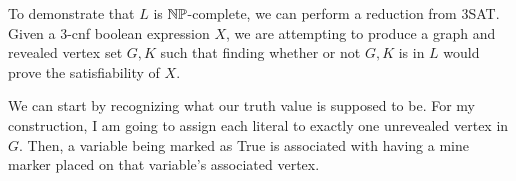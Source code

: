 \documentclass[11pt, reqno]{amsart}
\theoremstyle{plain}
\theoremstyle{definition}
\newcounter{r}
\begin{document}
\begin{enumerate}

    To demonstrate that $L$ is $\mathbb{N}\mathbb{P}$-complete, we can perform a reduction
    from 3SAT. Given a 3-cnf boolean expression $X$, we are attempting
    to produce a graph and revealed vertex set $G, K$ such that finding whether
    or not $G, K$ is in $L$ would prove the satisfiability of $X$.

    We can start by recognizing what our truth value is supposed to be. For my
    construction, I am going to assign each literal to exactly one unrevealed
    vertex in $G$. Then, a variable being marked as True is associated with
    having a mine marker placed on that variable's associated vertex.


\end{enumerate}
\end{document}
